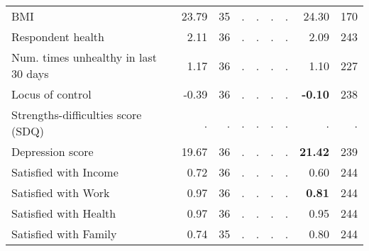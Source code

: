 \begin{tabular}{l r r r r r r r r}
BMI &     23.79 &        35 &         . & . &         . & . &     24.30 &       170 \\
Respondent health &      2.11 &        36 &         . & . &         . & . &      2.09 &       243 \\
Num. times unhealthy in last 30 days &      1.17 &        36 &         . & . &         . & . &      1.10 &       227 \\
Locus of control &     -0.39 &        36 &         . & . &         . & . & \textbf{    -0.10} &       238 \\
Strengths-difficulties score (SDQ) &         . & . &         . & . &         . & . &         . & . \\
Depression score &     19.67 &        36 &         . & . &         . & . & \textbf{    21.42} &       239 \\
Satisfied with Income &      0.72 &        36 &         . & . &         . & . &      0.60 &       244 \\
Satisfied with Work &      0.97 &        36 &         . & . &         . & . & \textbf{     0.81} &       244 \\
Satisfied with Health &      0.97 &        36 &         . & . &         . & . &      0.95 &       244 \\
Satisfied with Family &      0.74 &        35 &         . & . &         . & . &      0.80 &       244 \\
\bottomrule
\end{tabular}
